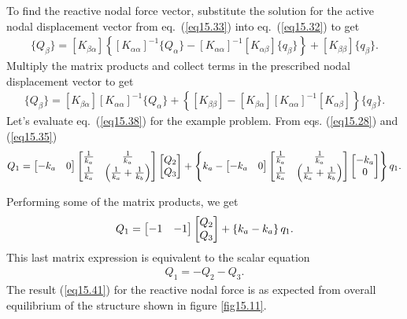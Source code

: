 \documentclass{AeroStructure-ERJohnson}
\begin{document}
To find the reactive nodal force vector, substitute the solution for the active nodal displacement vector from eq.~(\ref{eq15.33}) into eq.~(\ref{eq15.32}) to get
\begin{align}\label{eq15.37}
\{Q_{\beta}\}=[K_{\beta \alpha}]\left\{[K_{\alpha \alpha}]^{-1}\{Q_{\alpha}\}-\left[K_{\alpha \alpha}\right]^{-1}[K_{\alpha \beta}]\{q_{\beta}\}\right\}+\left[K_{\beta \beta}\right]\{q_{\beta}\}.
\end{align}
Multiply the matrix products and collect terms in the prescribed nodal displacement vector to get
\begin{align}\label{eq15.38}
\{Q_{\beta}\}=[K_{\beta \alpha}][K_{\alpha \alpha}]^{-1}\{Q_{\alpha}\}+\left\{\left[K_{\beta \beta}\right]-[K_{\beta \alpha}][K_{\alpha \alpha}]^{-1}[K_{\alpha \beta}]\right\}\{q_{\beta}\}.
\end{align}
\indent Let's evaluate eq.~(\ref{eq15.38}) for the example problem. From eqs. (\ref{eq15.28}) and (\ref{eq15.35})
\begin{align}\label{eq15.39}
Q_{1}=\left[\begin{array}{@{}ll@{}}-k_{a} & 0\end{array}\right]\left[\begin{array}{@{}cc@{}}\frac{1}{k_{a}} & \frac{1}{k_{a}} \\ \frac{1}{k_{a}} & \left(\frac{1}{k_{a}}+\frac{1}{k_{b}}\right)\end{array}\right]\left[\begin{array}{@{}l@{}}Q_{2} \\Q_{3}\end{array}\right]+\left\{k_{a}-\left[\begin{array}{@{}ll@{}}-k_{a} & 0\end{array}\right]\left[\begin{array}{@{}cc@{}}\frac{1}{k_{a}} & \frac{1}{k_{a}} \\ \frac{1}{k_{a}} & \left(\frac{1}{k_{a}}+\frac{1}{k_{b}}\right)\end{array}\right]\left[\begin{array}{@{}c@{}}-k_{a} \\0\end{array}\right]\right\} q_{1}.
\end{align}

\pagebreak

\noindent Performing some of the matrix products, we get
\begin{align}\label{eq15.40}
Q_{1}=\left[\begin{array}{@{}ll@{}}-1 & -1\end{array}\right]\left[\begin{array}{@{}l@{}}Q_{2} \\Q_{3}\end{array}\right]+\left\{k_{a}-k_{a}\right\} q_{1}.
\end{align}
This last matrix expression is equivalent to the scalar equation
\begin{align}\label{eq15.41}
Q_{1}=-Q_{2}-Q_{3}.
\end{align}
The result (\ref{eq15.41}) for the reactive nodal force is as expected from overall equilibrium of the structure shown in figure \ref{fig15.11}.
\end{document}
